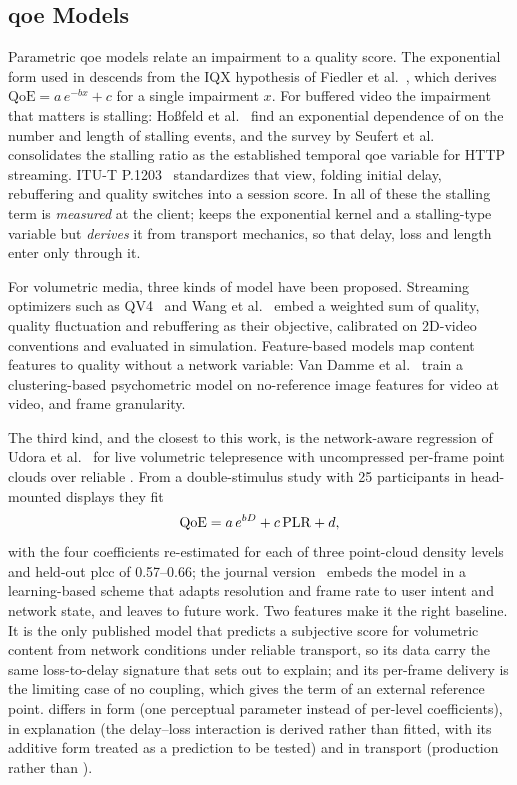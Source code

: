 \subsection{\gls{qoe} Models}
\label{sec:rw-models}

Parametric \gls{qoe} models relate an impairment to a quality score.
The exponential form used in \crystal descends from the IQX hypothesis
of Fiedler et al.~\cite{fiedler2010}, which derives
$\mathrm{QoE} = a\,e^{-bx} + c$ for a single impairment $x$. For buffered
video the impairment that matters is stalling: Ho{\ss}feld et
al.~\cite{hossfeld2011youtube} find an exponential dependence of \mos
on the number and length of stalling events, and the survey by Seufert et
al.~\cite{seufert2015survey} consolidates the stalling ratio as the
established temporal \gls{qoe} variable for HTTP streaming. ITU-T
P.1203~\cite{itu_p1203} standardizes that view, folding initial delay,
rebuffering and quality switches into a session score. In all of these
the stalling term is \emph{measured} at the client; \crystal keeps the
exponential kernel and a stalling-type variable but \emph{derives} it
from transport mechanics, so that delay, loss and \gof length enter
only through it.

For volumetric media, three kinds of model have been proposed.
Streaming optimizers such as QV4~\cite{qv424} and Wang et
al.~\cite{wang2022tmm} embed a weighted sum of quality, quality
fluctuation and rebuffering as their objective, calibrated on 2D-video
conventions and evaluated in simulation. Feature-based models map
content features to quality without a network variable: Van Damme et
al.~\cite{vandamme2024} train a clustering-based psychometric model on
no-reference image features for \vpcc video at video, \gof and frame
granularity.

The third kind, and the closest to this work, is the network-aware
regression of Udora et al.~\cite{qoeholographic,udora2026tmm} for live
volumetric telepresence with uncompressed per-frame point clouds over
reliable . From a double-stimulus study with 25
participants in head-mounted displays they fit
\begin{equation}
  \mathrm{QoE} = a\,e^{b D} + c\,\mathrm{PLR} + d,
  \label{eq:udora}
\end{equation}
with the four coefficients re-estimated for each of three point-cloud
density levels and held-out \gls{plcc} of 0.57--0.66; the journal
version~\cite{udora2026tmm} embeds the model in a learning-based scheme
that adapts resolution and frame rate to user intent and network
state, and leaves \quic to future work. Two features make it the right
baseline. It is the only published model that predicts a subjective
score for volumetric content from network conditions under reliable
transport, so its data carry the same loss-to-delay signature that
\crystal sets out to explain; and its per-frame delivery is the
limiting case of no \gof coupling, which gives the \gof term of
\crystal an external reference point. \crystal differs in form (one
perceptual parameter instead of per-level coefficients), in
explanation (the delay--loss interaction is derived rather than
fitted, with its additive form treated as a prediction to be tested)
and in transport (production \quic rather than ).
